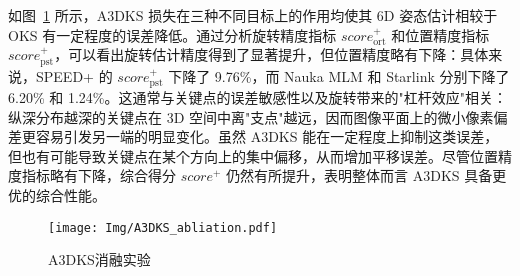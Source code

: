 如图~\ref{fig:A3DKS} 所示，A3DKS 损失在三种不同目标上的作用均使其 6D 姿态估计相较于 OKS 有一定程度的误差降低。通过分析旋转精度指标 $score_{\text{ort}}^+$ 和位置精度指标 $score_{\text{pst}}^+$，可以看出旋转估计精度得到了显著提升，但位置精度略有下降：具体来说，SPEED+ 的 $score_{\text{pst}}^+$ 下降了 9.76\%，而 Nauka MLM 和 Starlink 分别下降了 6.20\% 和 1.24\%。这通常与关键点的误差敏感性以及旋转带来的"杠杆效应"相关：纵深分布越深的关键点在 3D 空间中离"支点"越远，因而图像平面上的微小像素偏差更容易引发另一端的明显变化。虽然 A3DKS 能在一定程度上抑制这类误差，但也有可能导致关键点在某个方向上的集中偏移，从而增加平移误差。尽管位置精度指标略有下降，综合得分 $score^+$ 仍然有所提升，表明整体而言 A3DKS 具备更优的综合性能。



\begin{table*}[htbp] 
	\centering
	\caption{损失函数消融实验}
	\label{tab:OKSvsA3DKS}
	{%
	}
\end{table*}




\begin{figure}[htbp]
	\centering
	\texttt{[image: Img/A3DKS\_abliation.pdf]}
	\caption{A3DKS消融实验}
	\label{fig:A3DKS}
	\vspace{-3ex}
\end{figure}









